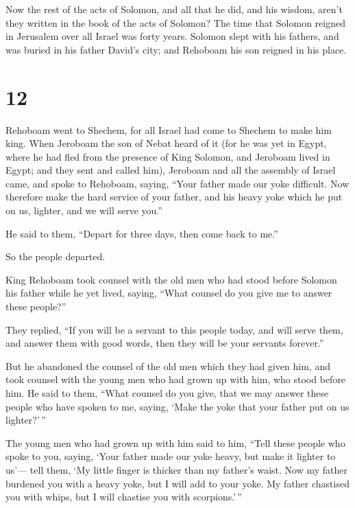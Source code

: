  Now the rest of the acts of Solomon, and all that he
did, and his wisdom, aren't they written in the book of the acts of
Solomon?  The time that Solomon reigned in Jerusalem over
all Israel was forty years.  Solomon slept with his
fathers, and was buried in his father David's city; and Rehoboam his son
reigned in his place.

\hypertarget{section-11}{%
\section{12}\label{section-11}}

 Rehoboam went to Shechem, for all Israel had come to
Shechem to make him king.  When Jeroboam the son of Nebat
heard of it (for he was yet in Egypt, where he had fled from the
presence of King Solomon, and Jeroboam lived in Egypt; 
and they sent and called him), Jeroboam and all the assembly of Israel
came, and spoke to Rehoboam, saying,  ``Your father made
our yoke difficult. Now therefore make the hard service of your father,
and his heavy yoke which he put on us, lighter, and we will serve you.''

 He said to them, ``Depart for three days, then come back
to me.''

So the people departed.

 King Rehoboam took counsel with the old men who had stood
before Solomon his father while he yet lived, saying, ``What counsel do
you give me to answer these people?''

 They replied, ``If you will be a servant to this people
today, and will serve them, and answer them with good words, then they
will be your servants forever.''

 But he abandoned the counsel of the old men which they
had given him, and took counsel with the young men who had grown up with
him, who stood before him.  He said to them, ``What
counsel do you give, that we may answer these people who have spoken to
me, saying, `Make the yoke that your father put on us lighter?'\,''

 The young men who had grown up with him said to him,
``Tell these people who spoke to you, saying, `Your father made our yoke
heavy, but make it lighter to us'--- tell them, `My little finger is
thicker than my father's waist.  Now my father burdened
you with a heavy yoke, but I will add to your yoke. My father chastised
you with whips, but I will chastise you with scorpions.'\,''

